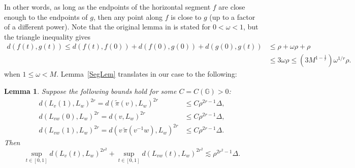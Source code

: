 \documentclass[11pt]{amsart}
\newtheorem{lemma}[theorem]{Lemma}
\theoremstyle{definition}
\numberwithin{theorem}{section} \numberwithin{equation}{section}
\begin{document}
In other words, 
as long as the endpoints of the horizontal segment $f$ are close enough to the endpoints of $g$,
then any point along $f$ is close to $g$ (up to a factor of a different power).
Note that the original lemma in \cite{LiThesis} is stated for $0 < \omega < 1$,
but the triangle inequality gives
\begin{align*}
d(f(t),g(t)) 
\leq d(f(t),f(0)) + d(f(0),g(0)) + d(g(0),g(t))
&\leq \rho + \omega \rho + \rho \\
&\leq 3\omega \rho
\leq (3 M^{1-\frac{1}{r}}) \omega^{1/r} \rho.
\end{align*}
when $1 \leq \omega < M$.
Lemma~\ref{SegLem} translates in our case to the following:
\begin{lemma}
\label{BoundLem}
Suppose the following bounds hold for some $C=C(\mathbb{G})>0$:
\begin{align}
d(L_v(1),L_w)^{2r} = d(\tilde{\pi}(v),L_w)^{2r} &\leq C\rho^{2r-1} \Delta, \label{i} \\
d(L_{vw}(0),L_w)^{2r} = d(v,L_w)^{2r} &\leq C\rho^{2r-1} \Delta, \label{ii} \\
d(L_{vw}(1),L_w)^{2r} = d(v \, \tilde{\pi}( v^{-1} w) ,L_w)^{2r} &\leq C\rho^{2r-1} \Delta. \label{iii}
\end{align}
Then 
$$
\sup_{t \in [0,1]} d(L_v(t),L_w)^{2r^2} + \sup_{t \in [0,1]} d(L_{vw}(t),L_w)^{2r^2}
\lesssim \rho^{2r^2-1} \Delta.
$$
\end{lemma}
\end{document}
